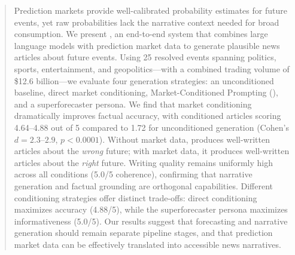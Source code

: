 \begin{abstract}
Prediction markets provide well-calibrated probability estimates for future events, yet raw probabilities lack the narrative context needed for broad consumption. We present \systemname, an end-to-end system that combines large language models with prediction market data to generate plausible news articles about future events. Using 25 resolved \polymarket events spanning politics, sports, entertainment, and geopolitics---with a combined trading volume of \$12.6 billion---we evaluate four generation strategies: an unconditioned baseline, direct market conditioning, Market-Conditioned Prompting (\mcp), and a superforecaster persona. We find that market conditioning dramatically improves factual accuracy, with conditioned articles scoring 4.64--4.88 out of 5 compared to 1.72 for unconditioned generation (Cohen's $d = 2.3$--$2.9$, $p < 0.0001$). Without market data, \gptfour produces well-written articles about the \emph{wrong} future; with market data, it produces well-written articles about the \emph{right} future. Writing quality remains uniformly high across all conditions (5.0/5 coherence), confirming that narrative generation and factual grounding are orthogonal capabilities. Different conditioning strategies offer distinct trade-offs: direct conditioning maximizes accuracy (4.88/5), while the superforecaster persona maximizes informativeness (5.0/5). Our results suggest that forecasting and narrative generation should remain separate pipeline stages, and that prediction market data can be effectively translated into accessible news narratives.
\end{abstract}
